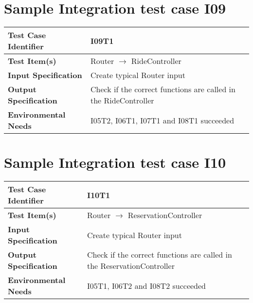 \section{Sample Integration test case I09}\label{I09}
\begin{center}
	\vspace{0.6cm}
	\begin{tabular}{|l|l|}
		\hline
		\textbf{Test Case Identifier} & I09T1 \bigstrut \\\hline
		\textbf{Test Item(s)} & Router \ensuremath{\rightarrow} RideController \bigstrut \\\hline
		\textbf{Input Specification} & Create typical Router input \bigstrut \\\hline
		\textbf{Output Specification} & Check if the correct functions are called in the RideController \bigstrut \\\hline
		\textbf{Environmental Needs} & I05T2, I06T1, I07T1 and I08T1 succeeded \bigstrut \\\hline
	\end{tabular}
\end{center}

\section{Sample Integration test case I10}\label{I10}
\begin{center}
	\vspace{0.6cm}
	\begin{tabular}{|l|l|}
		\hline
		\textbf{Test Case Identifier} & I10T1 \bigstrut \\\hline
		\textbf{Test Item(s)} & Router \ensuremath{\rightarrow} ReservationController \bigstrut \\\hline
		\textbf{Input Specification} & Create typical Router input \bigstrut \\\hline
		\textbf{Output Specification} & Check if the correct functions are called in the ReservationController \bigstrut \\\hline
		\textbf{Environmental Needs} & I05T1, I06T2 and I08T2 succeeded \bigstrut \\\hline
	\end{tabular}
\end{center}


